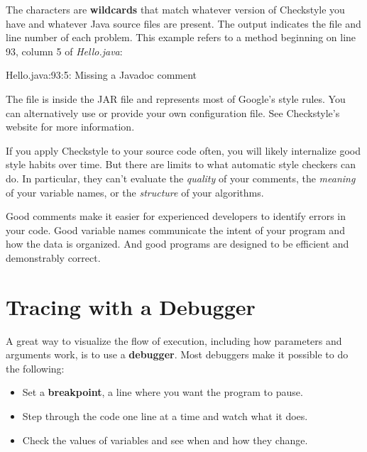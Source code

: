 
The {\tt *} characters are {\bf wildcards} that match whatever version of Checkstyle you have and whatever Java source files are present.
The output indicates the file and line number of each problem.
This example refers to a method beginning on line 93, column 5 of {\it Hello.java}:

\begin{stdout}
Hello.java:93:5: Missing a Javadoc comment
\end{stdout}

The file  is inside the JAR file and represents most of Google's style rules.
You can alternatively use  or provide your own configuration file.
See Checkstyle's website for more information.

If you apply Checkstyle to your source code often, you will likely internalize good style habits over time.
But there are limits to what automatic style checkers can do.
In particular, they can't evaluate the {\em quality} of your comments, the {\em meaning} of your variable names, or the {\em structure} of your algorithms.

Good comments make it easier for experienced developers to identify errors in your code.
Good variable names communicate the intent of your program and how the data is organized.
And good programs are designed to be efficient and demonstrably correct.


\section{Tracing with a Debugger}
\label{tools_tracing-with-a-debugger}


A great way to visualize the flow of execution, including how parameters and arguments work, is to use a {\bf debugger}.
Most debuggers make it possible to do the following:


\begin{itemize}
\item Set a {\bf breakpoint}, a line where you want the program to pause.
\item Step through the code one line at a time and watch what it does.
\item Check the values of variables and see when and how they change.
\end{itemize}

